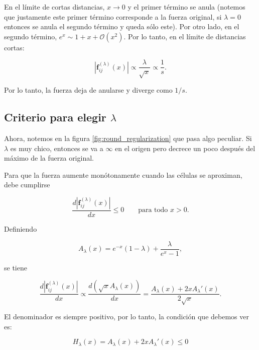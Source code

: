\documentclass[11pt,a4paper]{article}
\begin{document}
En el límite de cortas distancias, $x \rightarrow 0$ y el primer término se anula (notemos que justamente este primer término corresponde a la fuerza original, si $\lambda=0$ entonces se anula el segundo término y queda sólo este). Por otro lado, en el segundo término, $e^{x}\sim 1 + x +\mathcal{O}(x^{2})$. Por lo tanto, en el límite de distancias cortas:

\begin{equation}
	\left|\mathbf{ f}_{ij}^{(\lambda)}(x)\right|
	\propto 
	\frac{\lambda}
	{\sqrt{x}}\propto\frac{1}{s}.
\end{equation}

Por lo tanto, la fuerza deja de anularse y diverge como $1/s$.

\subsection{Criterio para elegir \texorpdfstring{$\lambda$}{lambda}}

Ahora, notemos en la figura \ref{fig:round_regularization} que pasa algo peculiar. Si $\lambda$ es muy chico, entonces se va a $\infty$ en el origen pero decrece un poco después del máximo de la fuerza original.

Para que la fuerza aumente monótonamente cuando las células se aproximan,
debe cumplirse

\begin{equation}
\frac{d\left|\mathbf{ f}_{ij}^{(\lambda)}(x)\right|}{dx}
\leq0
\qquad
\text{para todo }x>0.
\end{equation}

Definiendo

\begin{equation}
A_{\lambda}(x)
=e^{-x}(1-\lambda)
+
\frac{\lambda}
{e^{x}-1},
\end{equation}

se tiene

\begin{equation}
\frac{d\left|\mathbf{ f}_{ij}^{(\lambda)}(x)\right|}{dx}
\propto \frac{d(\sqrt{x}A_{\lambda}(x))}{dx} =
\frac{
A_{\lambda}(x)
+2xA_{\lambda}'(x)
}{2\sqrt{x}}.
\end{equation}

El denominador es siempre positivo, por lo tanto, la condición que debemos ver es:

\begin{equation}
	H_{\lambda}(x)=A_{\lambda}(x)
	+2xA_{\lambda}'(x) \leq 0
\end{equation}
\end{document}

